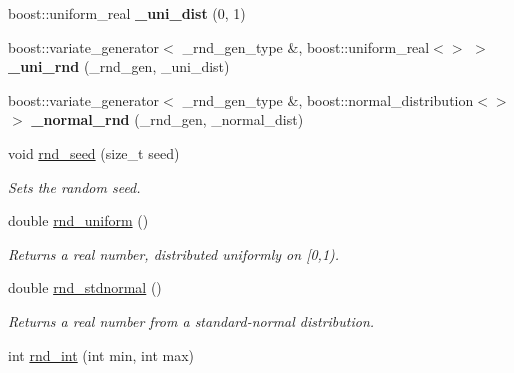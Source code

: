 \begin{CompactItemize}
\item 
\hypertarget{namespacedai_c351fd5d4833c533592d179d97f64ef8}{
boost::uniform\_\-real \textbf{\_\-uni\_\-dist} (0, 1)}
\label{namespacedai_c351fd5d4833c533592d179d97f64ef8}

\item 
\hypertarget{namespacedai_917c487cfce021627972a12d644c0e9d}{
boost::variate\_\-generator$<$ \_\-rnd\_\-gen\_\-type \&, boost::uniform\_\-real$<$$>$ $>$ \textbf{\_\-uni\_\-rnd} (\_\-rnd\_\-gen, \_\-uni\_\-dist)}
\label{namespacedai_917c487cfce021627972a12d644c0e9d}

\item 
\hypertarget{namespacedai_e8632edc2f82d536ec59fd5a50e8bf47}{
boost::variate\_\-generator$<$ \_\-rnd\_\-gen\_\-type \&, boost::normal\_\-distribution$<$$>$ $>$ \textbf{\_\-normal\_\-rnd} (\_\-rnd\_\-gen, \_\-normal\_\-dist)}
\label{namespacedai_e8632edc2f82d536ec59fd5a50e8bf47}

\item 
\hypertarget{namespacedai_e699eca7ca4d6e971b54c2b4a95942d4}{
void \hyperlink{namespacedai_e699eca7ca4d6e971b54c2b4a95942d4}{rnd\_\-seed} (size\_\-t seed)}
\label{namespacedai_e699eca7ca4d6e971b54c2b4a95942d4}

\begin{CompactList}\small\item\em Sets the random seed. \item\end{CompactList}\item 
\hypertarget{namespacedai_409fb3c0ffc14bf9e03a45014a9b4093}{
double \hyperlink{namespacedai_409fb3c0ffc14bf9e03a45014a9b4093}{rnd\_\-uniform} ()}
\label{namespacedai_409fb3c0ffc14bf9e03a45014a9b4093}

\begin{CompactList}\small\item\em Returns a real number, distributed uniformly on \mbox{[}0,1). \item\end{CompactList}\item 
\hypertarget{namespacedai_4367d2d1c1518023dd91b645d641fce7}{
double \hyperlink{namespacedai_4367d2d1c1518023dd91b645d641fce7}{rnd\_\-stdnormal} ()}
\label{namespacedai_4367d2d1c1518023dd91b645d641fce7}

\begin{CompactList}\small\item\em Returns a real number from a standard-normal distribution. \item\end{CompactList}\item 
\hypertarget{namespacedai_c02317b960b112637976333f90d1f937}{
int \hyperlink{namespacedai_c02317b960b112637976333f90d1f937}{rnd\_\-int} (int min, int max)}
\label{namespacedai_c02317b960b112637976333f90d1f937}


\end{CompactItemize}
